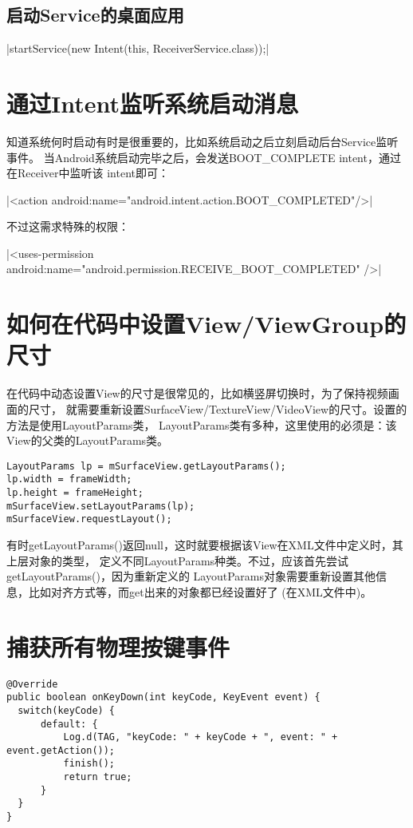 \subsection[启动Service的桌面应用]{启动Service的桌面应用}
|startService(new Intent(this, ReceiverService.class));|

\section[通过Intent监听系统启动消息]{通过Intent监听系统启动消息}
知道系统何时启动有时是很重要的，比如系统启动之后立刻启动后台Service监听事件。
当Android系统启动完毕之后，会发送BOOT\_COMPLETE intent，通过在Receiver中监听该
intent即可：\par
{}|<action android:name="android.intent.action.BOOT_COMPLETED"/>|

不过这需求特殊的权限：\par
{}|<uses-permission android:name="android.permission.RECEIVE_BOOT_COMPLETED" />|


\section[如何在代码中设置View/ViewGroup的尺寸]{如何在代码中设置View/ViewGroup的尺寸}
在代码中动态设置View的尺寸是很常见的，比如横竖屏切换时，为了保持视频画面的尺寸，
就需要重新设置SurfaceView/TextureView/VideoView的尺寸。设置的方法是使用LayoutParams类，
LayoutParams类有多种，这里使用的必须是：该View的父类的LayoutParams类。

\begin{verbatim}
LayoutParams lp = mSurfaceView.getLayoutParams();
lp.width = frameWidth;
lp.height = frameHeight;
mSurfaceView.setLayoutParams(lp);
mSurfaceView.requestLayout();
\end{verbatim}

有时getLayoutParams()返回null，这时就要根据该View在XML文件中定义时，其上层对象的类型，
定义不同LayoutParams种类。不过，应该首先尝试getLayoutParams()，因为重新定义的
LayoutParams对象需要重新设置其他信息，比如对齐方式等，而get出来的对象都已经设置好了
(在XML文件中)。

\section[捕获所有物理按键事件]{捕获所有物理按键事件}
\begin{verbatim}
@Override
public boolean onKeyDown(int keyCode, KeyEvent event) {
  switch(keyCode) {
      default: {
          Log.d(TAG, "keyCode: " + keyCode + ", event: " + event.getAction());
          finish();
          return true;
      }
  }
}
\end{verbatim}

